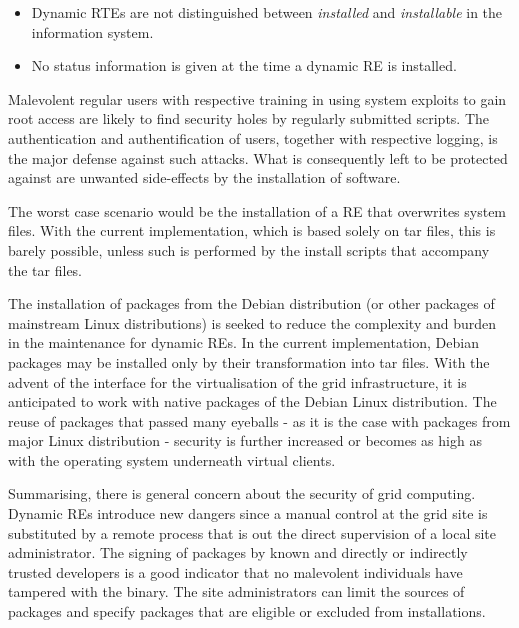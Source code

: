 \begin{itemize}
\item Dynamic RTEs are not distinguished between {\em installed} and
  {\em installable} in the information system.
\item No status information is given at the time a dynamic RE is installed.
\end{itemize}

Malevolent regular users with respective training in using system exploits
to gain root access are likely to find security holes by regularly
submitted scripts.  The authentication and authentification of users,
together with respective logging, is the major defense against such
attacks. What is consequently left to be protected against are unwanted
side-effects by the installation of software.

The worst case scenario would be the installation of a RE
that overwrites system files. With the current implementation, which is
based solely on tar files, this is barely possible, unless such is
performed by the install scripts that accompany the tar files.

The installation of packages from the Debian distribution (or other
packages of mainstream Linux distributions) is seeked to reduce the
complexity and burden in the maintenance for dynamic REs. In the
current implementation, Debian packages may be installed only by their
transformation into tar files. With the advent of the interface for
the virtualisation of the grid infrastructure, it is anticipated to
work with native packages of the Debian Linux distribution. The reuse
of packages that passed many eyeballs - as it is the case with packages
from major Linux distribution - security is further increased or becomes
as high as with the operating system underneath virtual clients.

Summarising, there is general concern about the security of grid
computing.  Dynamic REs introduce new dangers since a
manual control at the grid site is substituted by a remote process that
is out the direct supervision of a local site administrator. The signing
of packages by known and directly or indirectly trusted developers is
a good indicator that no malevolent individuals have tampered with the
binary. The site administrators can limit the sources of packages and
specify packages that are eligible or excluded from installations.



% 
